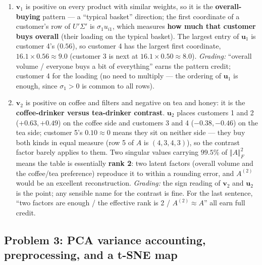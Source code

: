\documentclass[
  11pt,
]{article}
\newcommand{\answerspace}[1]{\par\vspace*{#1}}  %
\newcommand{\answerpage}{\clearpage}
\begin{document}
\answerspace{1.6in}

\begin{solutionbox}

\begin{enumerate}
\def\labelenumi{(\alph{enumi})}
\item
  \(\mathbf v_1\) is positive on every product with similar weights, so
  it is the \textbf{overall-buying} pattern --- a ``typical basket''
  direction; the first coordinate of a customer's row of \(U'\Sigma'\)
  is \(\sigma_1 u_{i1}\), which measures \textbf{how much that customer
  buys overall} (their loading on the typical basket). The largest entry
  of \(\mathbf u_1\) is customer 4's (\(0.56\)), so customer 4 has the
  largest first coordinate, \(16.1\times0.56 \approx 9.0\) (customer 3
  is next at \(16.1\times0.50\approx8.0\)). \emph{Grading:} ``overall
  volume / everyone buys a bit of everything'' earns the pattern credit;
  customer 4 for the loading (no need to multiply --- the ordering of
  \(\mathbf u_1\) is enough, since \(\sigma_1>0\) is common to all
  rows).
\item
  \(\mathbf v_2\) is positive on coffee and filters and negative on tea
  and honey: it is the \textbf{coffee-drinker versus tea-drinker
  contrast}. \(\mathbf u_2\) places customers 1 and 2 (\(+0.63, +0.49\))
  on the coffee side and customers 3 and 4 (\(-0.38, -0.46\)) on the tea
  side; customer 5's \(0.10\approx0\) means they sit on neither side ---
  they buy both kinds in equal measure (row 5 of \(A\) is
  \((4,3,4,3)\)), so the contrast factor barely applies to them. Two
  singular values carrying \(99.5\%\) of \(\Vert A\Vert_F^2\) means the
  table is essentially \textbf{rank 2}: two latent factors (overall
  volume and the coffee/tea preference) reproduce it to within a
  rounding error, and \(A^{(2)}\) would be an excellent reconstruction.
  \emph{Grading:} the sign reading of \(\mathbf v_2\) and
  \(\mathbf u_2\) is the point; any sensible name for the contrast is
  fine. For the last sentence, ``two factors are enough / the effective
  rank is 2 / \(A^{(2)}\approx A\)'' all earn full credit.
\end{enumerate}

\end{solutionbox}

\answerpage

\subsection{Problem 3: PCA variance accounting, preprocessing, and a
t-SNE
map}\label{problem-3-pca-variance-accounting-preprocessing-and-a-t-sne-map}
\end{document}
